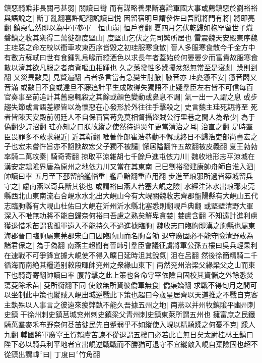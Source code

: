 鎮惡騎乘非長關弓甚弱|{
	關讀曰彎}
而有謀略善果斷喜論軍國大事或薦鎮惡於劉裕裕與語說之|{
	斷丁亂翻喜許記翻說讀曰悦}
因留宿明旦謂參佐曰吾聞將門有將|{
	將即亮翻}
鎮惡信然即以為中軍參軍　恒山崩|{
	恒戶登翻}
夏四月乞伏乾歸如枹罕留世子熾磐鎮之收其衆得二萬徙都度堅山|{
	度堅山乞伏之先司繁所居也}
雷震魏天安殿東序魏主珪惡之命左校以衝車攻東西序皆毁之初珪服寒食散|{
	晉人多服寒食散今千金方中有數方蘇軾曰世有食鍾乳烏喙而縱酒色以求長年者蓋始於何晏晏少而富貴故服寒食散以濟其欲凡服之者疽背嘔血相踵也}
久之藥發性多躁擾忿怒無常至是寖劇|{
	躁則到翻}
又災異數見|{
	見賢遍翻}
占者多言當有急變生肘腋|{
	腋音亦}
珪憂懣不安|{
	懣音悶又音滿}
或數日不食或達旦不寐追計平生成敗得失獨語不止疑羣臣左右皆不可信每百官奏事至前追計其舊惡輒殺之其餘或顔色變動或鼻息不調|{
	氣一出一入謂之息}
或步趨失節或言語差繆皆以為懷惡在心發形於外往往手擊殺之|{
	史言魏主珪死期將至}
死者皆陳天安殿前朝廷人不自保百官苟免莫相督攝盜賊公行里巷之間人為希少|{
	為于偽翻少詩沼翻}
珪亦知之曰朕故縱之使然待過災年更當清治之耳|{
	治直之翻}
是時羣臣畏罪多不敢求親近|{
	近其靳翻}
唯著作郎崔浩恭勤不懈或終日不歸浩吏部尚書宏之子也宏未嘗忤旨亦不諂諛故宏父子獨不被譴|{
	懈居隘翻忤五故翻被皮義翻}
夏王勃勃率騎二萬攻秦|{
	騎奇寄翻}
掠取平涼雜胡七千餘戶進屯依力川|{
	魏收地形志平涼城在漢安定鶉隂界唐為原州之地依力川又當在其東南}
己巳劉裕發建康帥舟師自淮入泗|{
	帥讀曰率}
五月至下邳留船艦輜重|{
	艦戶黯翻重直用翻}
步進至琅邪所過皆築城留兵守之|{
	慮南燕以奇兵斷其後也}
或謂裕曰燕人若塞大峴之險|{
	水經注沐水出琅琊東莞縣西北山東南流右合峴水水北出大峴山今有大峴關魏收志齊郡盤陽縣有大峴山五代志臨胊縣有大峴山杜佑曰大峴在沂州沂水縣北塞悉則翻峴戶典翻}
或堅壁清野大軍深入不唯無功將不能自歸奈何裕曰吾慮之熟矣鮮卑貪婪|{
	婪盧含翻}
不知遠計進利虜獲退惜禾苖謂我孤軍遠入不能持久不過進據臨朐|{
	魏收志曰臨朐即漢之朐縣也屬東海郡晉曰臨胊屬東莞郡宋白曰因臨胊山而名朐音劬}
退守廣固必不能守險清野敢為諸君保之|{
	為于偽翻}
南燕主超聞有晉師引羣臣會議征虜將軍公孫五樓曰吳兵輕果利在速戰不可爭鋒宜據大峴使不得入曠日延時沮其銳氣|{
	沮在呂翻}
然後徐簡精騎二千循海而南絶其糧道别敕段暉帥兖州之衆緣山東下|{
	南然兖州治梁父緣梁父之山而東下也騎奇寄翻帥讀曰率}
腹背擊之此上策也各命守宰依險自固校其資儲之外餘悉焚蕩芟除禾苖|{
	芟所銜翻下同}
使敵無所資彼僑軍無食|{
	僑渠嬌翻}
求戰不得旬月之間可以坐制此中策也縱賊入峴出城逆戰此下策也超曰今歲星居齊以天道推之不戰自克客主埶殊以人事言之彼遠來疲弊埶不能久吾據五州之地|{
	南燕以并州牧鎮隂平幽州刺史鎮干徐州刺史鎮莒城兖州刺史鎮梁父青州刺史鎮東萊所謂五州也}
擁富庶之民鐵騎萬羣麥禾布野奈何芟苖徙民先自蹙弱乎不如縱使入峴以精騎蹂之何憂不克|{
	蹂人九翻}
輔國將軍廣寜王賀賴盧苦諫不從退謂五樓曰必若此亡無日矣太尉桂林王鎮曰陛下必以騎兵利平地者宜出峴逆戰戰而不勝猶可退守不宜縱敵入峴自棄險固也超不從鎮出謂韓曰|{
	丁度曰竹角翻}
